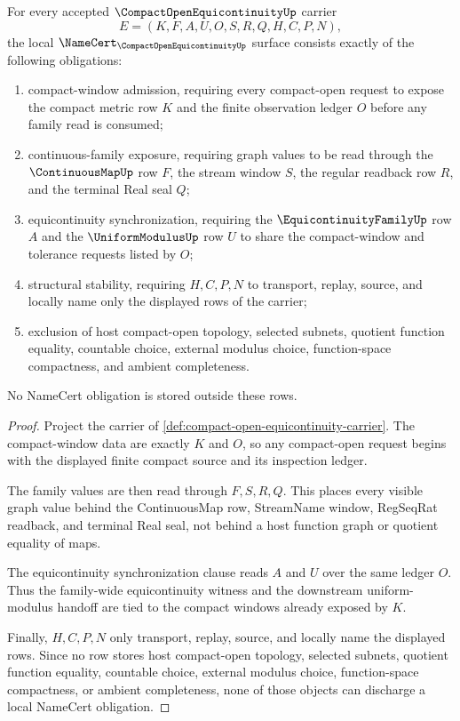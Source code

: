 \begin{theorem}
\label{thm:compact-open-equicontinuity-namecert-obligations}
For every accepted $\CompactOpenEquicontinuityUp$ carrier
$$
E=(K,F,A,U,O,S,R,Q,H,C,P,N),
$$
the local $\NameCert_{\CompactOpenEquicontinuityUp}$ surface consists exactly of the following obligations:
\begin{enumerate}
\item compact-window admission, requiring every compact-open request to expose the compact metric row $K$ and the finite observation ledger $O$ before any family read is consumed;
\item continuous-family exposure, requiring graph values to be read through the $\ContinuousMapUp$ row $F$, the stream window $S$, the regular readback row $R$, and the terminal Real seal $Q$;
\item equicontinuity synchronization, requiring the $\EquicontinuityFamilyUp$ row $A$ and the $\UniformModulusUp$ row $U$ to share the compact-window and tolerance requests listed by $O$;
\item structural stability, requiring $H,C,P,N$ to transport, replay, source, and locally name only the displayed rows of the carrier;
\item exclusion of host compact-open topology, selected subnets, quotient function equality, countable choice, external modulus choice, function-space compactness, and ambient completeness.
\end{enumerate}
No NameCert obligation is stored outside these rows.
\end{theorem}
\begin{proof}
Project the carrier of \autoref{def:compact-open-equicontinuity-carrier}. The compact-window data are exactly $K$ and $O$, so any compact-open request begins with the displayed finite compact source and its inspection ledger.

The family values are then read through $F,S,R,Q$. This places every visible graph value behind the ContinuousMap row, StreamName window, RegSeqRat readback, and terminal Real seal, not behind a host function graph or quotient equality of maps.

The equicontinuity synchronization clause reads $A$ and $U$ over the same ledger $O$. Thus the family-wide equicontinuity witness and the downstream uniform-modulus handoff are tied to the compact windows already exposed by $K$.

Finally, $H,C,P,N$ only transport, replay, source, and locally name the displayed rows. Since no row stores host compact-open topology, selected subnets, quotient function equality, countable choice, external modulus choice, function-space compactness, or ambient completeness, none of those objects can discharge a local NameCert obligation.
\end{proof}

